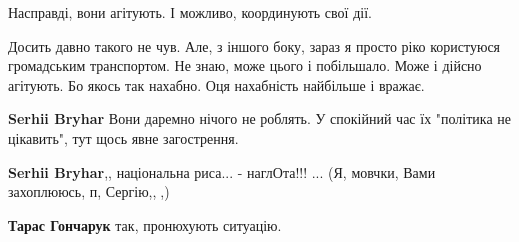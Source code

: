 \begin{itemize}
 
Насправді, вони агітують. І можливо, координують свої дії.

\begin{itemize}
 
Досить давно такого не чув. Але, з іншого боку, зараз я просто ріко користуюся громадським транспортом. Не знаю, може цього і побільшало. Може і дійсно агітують. Бо якось так нахабно. Оця нахабність найбільше і вражає.

 
\textbf{Serhii Bryhar} Вони даремно нічого не роблять. У спокійний час їх "політика не цікавить", тут щось явне загострення.

 
\textbf{Serhii Bryhar},, національна риса... - наглОта!!! ... (Я, мовчки, Вами захоплююсь, п, Сергію,,🙏,)

 
\textbf{Тарас Гончарук} так, пронюхують ситуацію.
\end{itemize}

 

\end{itemize}
